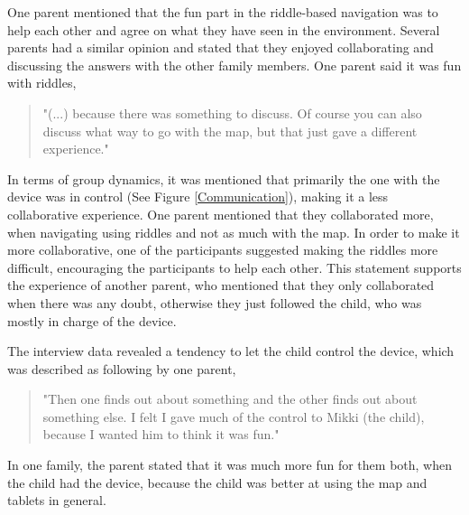 One parent mentioned that the fun part in the riddle-based navigation was to help each other and agree on what they have seen in the environment. Several parents had a similar opinion and stated that they enjoyed collaborating and discussing the answers with the other family members. One parent said it was fun with riddles, 

\begin{quote}
    "(...) because there was something to discuss. Of course you can also discuss what way to go with the map, but that just gave a different experience."
\end{quote}

In terms of group dynamics, it was mentioned that primarily the one with the device was in control (See Figure \ref{Communication}), making it a less collaborative experience. One parent mentioned that they collaborated more, when navigating using riddles and not as much with the map. In order to make it more collaborative, one of the participants suggested making the riddles more difficult, encouraging the participants to help each other. This statement supports the experience of another parent, who mentioned that they only collaborated when there was any doubt, otherwise they just followed the child, who was mostly in charge of the device. 

The interview data revealed a tendency to let the child control the device, which was described as following by one parent,  

\begin{quote}
    "Then one finds out about something and the other finds out about something else. I 
felt I gave much of the control to Mikki (the child), because I wanted him to think it 
was fun."
\end{quote}
 
In one family, the parent stated that it was much more fun for them both, when the child had the device, because the child was better at using the map and tablets in general.
